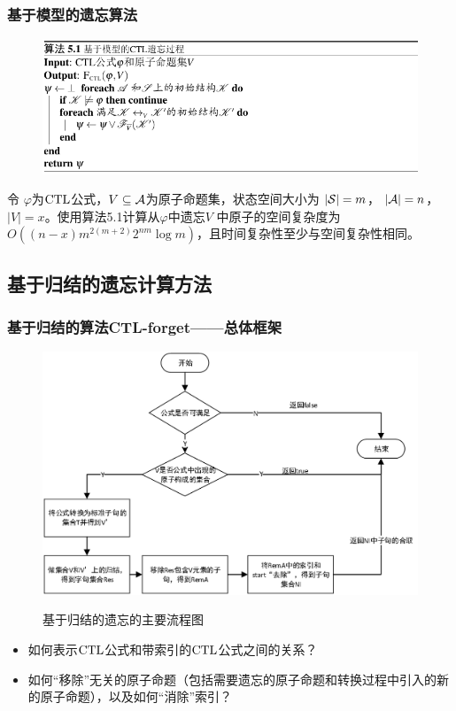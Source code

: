 \documentclass[9pt, CJK]{beamer}
\begin{document}
\begin{frame}
	\frametitle{基于模型的遗忘算法}
	{\footnotesize
		\begin{figure}
			\includegraphics[scale=0.45]{figures/model-basedAlg}
		\end{figure}
	
	\begin{proposition}\label{pro:time:alg1}
		令 $\varphi$为$\textrm{CTL}$公式，$V\subseteq {\cal A}$为原子命题集，状态空间大小为 $|{\cal S}|=m$， $|{\cal A}|=n$，$|V|=x$。使用算法5.1计算从$\varphi$中遗忘$V$ 中原子的空间复杂度为 $O((n-x)m^{2(m+2)}2^{nm}  \log m)$，且时间复杂性至少与空间复杂性相同。
	\end{proposition}
	}
\end{frame}

\subsection{基于归结的遗忘计算方法}
\begin{frame}
	\frametitle{基于归结的算法CTL-forget——{\footnotesize 总体框架}}
	{\footnotesize
		\begin{figure}
			\centering
			\includegraphics[scale=0.5]{figures/frame2}\\
			\caption{基于归结的遗忘的主要流程图}
			\label{Fig:chapter05:v1uv2}
		\end{figure}
	
	\begin{itemize}
		\item 如何表示$\textrm{CTL}$公式和带索引的$\textrm{CTL}$公式之间的关系？
		\item 如何“移除”无关的原子命题（包括需要遗忘的原子命题和转换过程中引入的新的原子命题），以及如何“消除”索引？
	\end{itemize}
	}
\end{frame}
\end{document}
